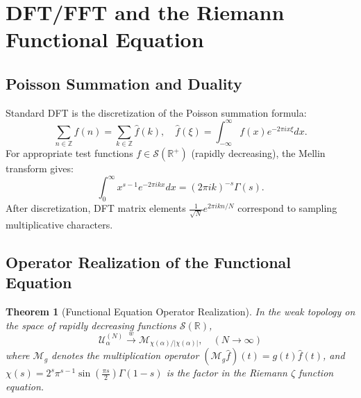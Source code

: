 \documentclass[12pt,a4paper]{amsart}
\theoremstyle{plain}
\newtheorem{theorem}{Theorem}[section]
\theoremstyle{definition}
\theoremstyle{remark}
\begin{document}
\section{DFT/FFT and the Riemann Functional Equation}

\subsection{Poisson Summation and Duality}

Standard DFT is the discretization of the Poisson summation formula:
\begin{equation}
\sum_{n\in\mathbb{Z}} f(n) = \sum_{k\in\mathbb{Z}} \hat{f}(k), \quad \hat{f}(\xi) = \int_{-\infty}^\infty f(x) e^{-2\pi i x\xi}dx.
\end{equation}
For appropriate test functions $f\in\mathcal{S}(\mathbb{R}^+)$ (rapidly decreasing), the Mellin transform gives:
\begin{equation}
\int_0^\infty x^{s-1} e^{-2\pi i k x} dx = (2\pi i k)^{-s} \Gamma(s).
\end{equation}
After discretization, DFT matrix elements $\frac{1}{\sqrt{N}} e^{2\pi i k n/N}$ correspond to sampling multiplicative characters.

\subsection{Operator Realization of the Functional Equation}

\begin{theorem}[Functional Equation Operator Realization]\label{thm:func_eq}
In the weak topology on the space of rapidly decreasing functions $\mathcal{S}(\mathbb{R})$,
\begin{equation}
\mathcal{U}_\alpha^{(N)} \xrightarrow{w} \mathcal{M}_{\chi(\alpha)/|\chi(\alpha)|}, \quad (N\to\infty)
\end{equation}
where $\mathcal{M}_{g}$ denotes the multiplication operator $(\mathcal{M}_g \hat{f})(t) = g(t)\hat{f}(t)$, and $\chi(s)=2^s\pi^{s-1}\sin(\frac{\pi s}{2})\Gamma(1-s)$ is the factor in the Riemann $\zeta$ function equation.
\end{theorem}
\end{document}

